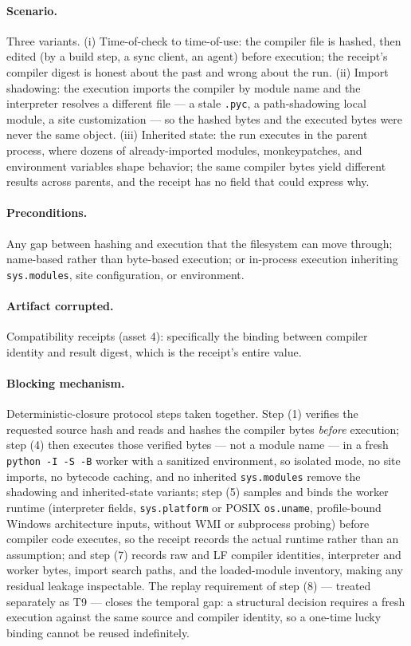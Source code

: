\paragraph{Scenario.} Three variants. (i) Time-of-check to time-of-use: the compiler file is hashed, then edited (by a build step, a sync client, an agent) before execution; the receipt's compiler digest is honest about the past and wrong about the run. (ii) Import shadowing: the execution imports the compiler by module name and the interpreter resolves a different file --- a stale \texttt{.pyc}, a path-shadowing local module, a site customization --- so the hashed bytes and the executed bytes were never the same object. (iii) Inherited state: the run executes in the parent process, where dozens of already-imported modules, monkeypatches, and environment variables shape behavior; the same compiler bytes yield different results across parents, and the receipt has no field that could express why.

\paragraph{Preconditions.} Any gap between hashing and execution that the filesystem can move through; name-based rather than byte-based execution; or in-process execution inheriting \texttt{sys.modules}, site configuration, or environment.

\paragraph{Artifact corrupted.} Compatibility receipts (asset 4): specifically the binding between compiler identity and result digest, which is the receipt's entire value.

\paragraph{Blocking mechanism.} Deterministic-closure protocol steps taken together. Step (1) verifies the requested source hash and reads and hashes the compiler bytes \emph{before} execution; step (4) then executes those verified bytes --- not a module name --- in a fresh \texttt{python -I -S -B} worker with a sanitized environment, so isolated mode, no site imports, no bytecode caching, and no inherited \texttt{sys.modules} remove the shadowing and inherited-state variants; step (5) samples and binds the worker runtime (interpreter fields, \texttt{sys.platform} or POSIX \texttt{os.uname}, profile-bound Windows architecture inputs, without WMI or subprocess probing) before compiler code executes, so the receipt records the actual runtime rather than an assumption; and step (7) records raw and LF compiler identities, interpreter and worker bytes, import search paths, and the loaded-module inventory, making any residual leakage inspectable. The replay requirement of step (8) --- treated separately as T9 --- closes the temporal gap: a structural decision requires a fresh execution against the same source and compiler identity, so a one-time lucky binding cannot be reused indefinitely.

